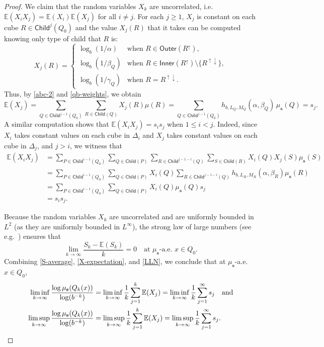 \documentclass[12pt]{amsart}
\theoremstyle{definition}
\theoremstyle{remark}
\newcommand{\EE}{\mathbb{E}}
\newcommand{\muse}{\mu_{\mathbf{s}}}
\newcommand{\Child}{\mathsf{Child}}
\newcommand{\Outer}{\mathsf{Outer}}
\newcommand{\Inner}{\mathsf{Inner}}
\numberwithin{figure}{section}
\numberwithin{equation}{section}
\begin{document}
\begin{proof}
We claim that the random variables $X_k$ are uncorrelated, i.e.~$\EE(X_iX_j)=\EE(X_i)\EE(X_j)$ for all $i\neq j$. For each $j\geq 1$, $X_j$ is constant on each cube $R\in\Child^j(Q_0)$ and the value $X_j(R)$ that it takes can be computed knowing only type of child that $R$ is: \begin{equation}X_j(R)=\left\{\begin{array}{ll}\log_b(1/\alpha) &\text{when } R\in\Outer(R^\uparrow),\\ \log_b(1/\beta_Q) &\text{when } R\in\Inner(R^\uparrow)\setminus\{R^{\uparrow\downarrow}\},\\ \log_b(1/\gamma_Q) &\text{when } R=R^{\uparrow\downarrow}.\end{array}\right.\end{equation} Thus, by \eqref{abc-2} and \eqref{qb-weights}, we obtain \begin{equation}\label{X-expectation} \EE(X_j)= \!\!\!\sum_{Q\in\Child^{j-1}(Q_0)} \sum_{R\in\Child(Q)} \!\!\! X_j(R)\mu(R) =\!\!\!\sum_{Q\in\Child^{j-1}(Q_0)} \!\!\! h_{b,L_Q,M_Q}(\alpha,\beta_Q)\,\muse(Q)=s_j.\end{equation}  A similar computation shows that $\EE(X_iX_j)=s_is_j$ when $1\leq i<j$. Indeed, since $X_i$ takes constant values on each cube in $\Delta_i$ and $X_j$ takes constant values on each cube in $\Delta_j$, and $j>i$, we witness that \begin{equation}\begin{split}
\EE(X_iX_j)&=\sum_{P\in\Child^{i-1}(Q_0)}\sum_{Q\in\Child(P)}\sum_{R\in\Child^{j-1-i}(Q)}\sum_{S\in\Child(R)} X_i(Q)X_j(S)\muse(S)\\
&=\sum_{P\in\Child^{i-1}(Q_0)}\sum_{Q\in\Child(P)}X_i(Q)\sum_{R\in\Child^{j-1-i}(Q)} h_{b,L_R,M_R}(\alpha,\beta_R) \muse(R)\\
&=\sum_{P\in\Child^{i-1}(Q_0)}\sum_{Q\in\Child(P)}X_i(Q)\muse(Q)s_j\\
&=s_is_j.
\end{split}\end{equation}

Because the random variables $X_k$ are uncorrelated and are uniformly bounded in $L^2$ (as they are uniformly bounded in $L^\infty$), the strong law of large numbers (see e.g.~\cite[Theorem 5.1.2]{Chung-probability}) ensures that \begin{equation}\label{LLN} \lim_{k\rightarrow\infty} \frac{S_k-\EE(S_k)}{k}=0\quad\text{at $\muse$-a.e.~$x\in Q_0$}.\end{equation} Combining \eqref{S-average}, \eqref{X-expectation}, and \eqref{LLN}, we conclude that at $\muse$-a.e.~$x\in Q_0$, \begin{align*}
\liminf_{k\rightarrow\infty} \frac{\log \muse(Q_k(x))}{\log (b^{-k})}
   &=\liminf_{k\rightarrow\infty} \frac{1}{k}\sum_{j=1}^k \EE(X_j)
    = \liminf_{k\rightarrow\infty} \frac{1}{k}\sum_{j=1}^\infty s_j\quad\text{and}\\
\limsup_{k\rightarrow\infty} \frac{\log \muse(Q_k(x))}{\log (b^{-k})}
   &=\limsup_{k\rightarrow\infty} \frac{1}{k}\sum_{j=1}^k \EE(X_j)
    = \limsup_{k\rightarrow\infty} \frac{1}{k}\sum_{j=1}^\infty s_j.\qedhere\end{align*}
\end{proof}
\end{document}
